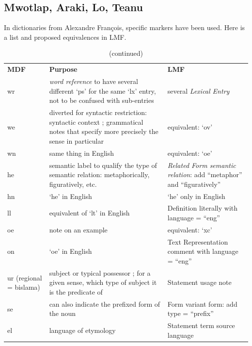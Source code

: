 \documentclass[a4paper,12pt]{article}
\begin{document}
\pagebreak



\pagebreak

\subsection{Mwotlap, Araki, Lo, Teanu}

In dictionaries from Alexandre François, specific markers have been used. Here is a list and proposed equivalences in LMF.

\begin{center}
\begin{longtable}{|p{4cm}|p{5cm}|p{6cm}|}
\caption[]{Mowtlap dictionary: matching between MDF and LMF} \\ \hline
\endfirsthead
\caption[]{(continued)} \\
\endhead
\endfoot
\endlastfoot
\textbf{MDF} & \textbf{Purpose} & \textbf{LMF} \\ \hline
wr & \textit{word reference} to have several different ‘ps’ for the same ‘lx’ entry, not to be confused with sub-entries & several \textit{Lexical Entry} \\ \hline
we & diverted for syntactic restriction: syntactic context ; grammatical notes that specify more precisely the sense in particular & equivalent: `ov' \\ \hline
wn & same thing in English & equivalent: `oe' \\ \hline
he & semantic label to qualify the type of semantic relation: metaphorically, figuratively, etc. & \textit{Related Form semantic relation}: add ``metaphor'' and ``figuratively'' \\ \hline
hn & `he' in English & `he' only in English \\ \hline
ll & equivalent of `lt' in English & Definition literally with language = “eng” \\ \hline
oe & note on an example & equivalent: `xc' \\ \hline
on & `oe' in English & Text Representation comment with language = “eng” \\ \hline
ur (regional = bislama) & subject or typical possessor ; for a given sense, which type of subject it is the predicate of & Statement usage note \\ \hline
se & can also indicate the prefixed form of the noun & Form variant form: add type = “prefix” \\ \hline
el & language of etymology & Statement term source language \\ \hline

\end{longtable}
\end{center}
\end{document}
